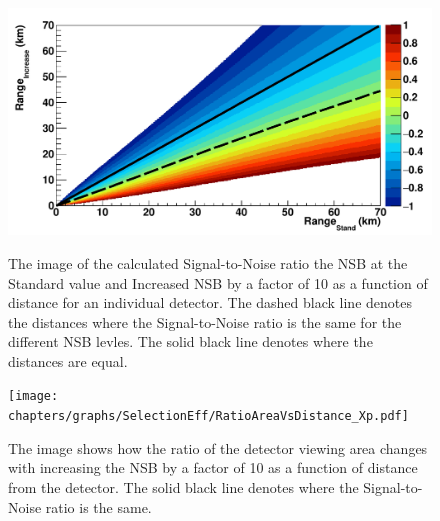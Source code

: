 \begin{figure}
\centering
\includegraphics[width=\textwidth]{chapters/graphs/SelectionEff/RangeIncreaseVsRangeStand_Xp.pdf}
\caption{The image of the calculated Signal-to-Noise ratio the NSB at the Standard value and Increased NSB by a factor of 10 as a function of distance for an individual detector. The dashed black line denotes the distances where the Signal-to-Noise ratio is the same for the different NSB levles. The solid black line denotes where the distances are equal.}\label{fig:RangeIncVsRangeStand}
\texttt{[image: chapters/graphs/SelectionEff/RatioAreaVsDistance\_Xp.pdf]}
\caption{The image shows how the ratio of the detector viewing area changes with increasing the NSB by a factor of 10 as a function of distance from the detector. The solid black line denotes where the Signal-to-Noise ratio is the same.}\label{fig:RatioAreaVsDistance}
\end{figure}

